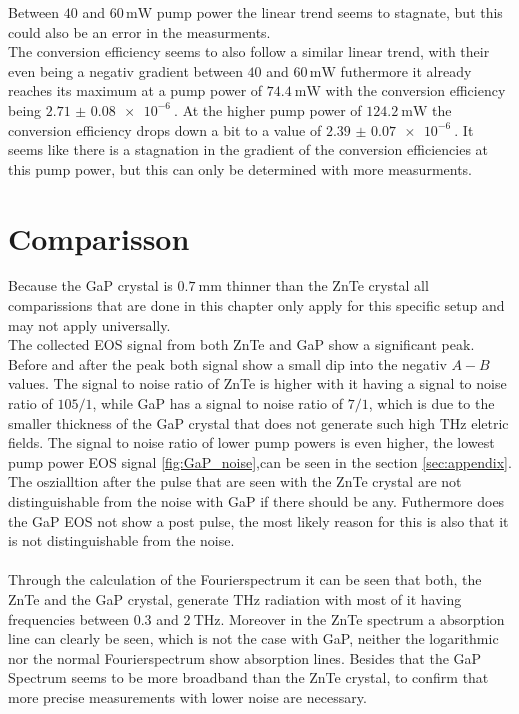 Between $40$ and $60 \, \si{\milli\W}$ pump power the linear trend seems to stagnate, but this could also be an error in the measurments.
\\
The conversion efficiency seems to also follow a similar linear trend, with their even being a negativ gradient between  $40$ and $60 \, \si{\milli\W}$ futhermore it already reaches its maximum at a pump power of $\SI{74.4}{\milli\W}$ with the conversion efficiency being $\SI{2.71(8)e-6}{}$.
At the higher pump power of $\SI{124.2}{\milli\W}$ the conversion efficiency drops down a bit to a value of $\SI{2.39(7)e-6}{}$.
It seems like there is a stagnation in the gradient of the conversion efficiencies at this pump power, but this can only be determined with more measurments.
\FloatBarrier
\section{Comparisson}
Because the GaP crystal is $\SI{0.7}{\milli\meter}$ thinner than the ZnTe crystal all comparissions that are done in this chapter only apply for this specific setup and may not apply universally.
\\
The collected EOS signal from both ZnTe and GaP show a significant peak.
Before and after the peak both signal show a small dip into the negativ $A-B$ values.
The signal to noise ratio of ZnTe is higher with it having a signal to noise ratio of $105/1$, while GaP has a signal to noise ratio of $7/1$, which is due to the smaller thickness of the GaP crystal that does not generate such high $\si{\tera\hertz}$ eletric fields.
The signal to noise ratio of lower pump powers is even higher, the lowest pump power EOS signal \ref{fig:GaP_noise},can be seen in the section \ref{sec:appendix}.
The oszialltion after the pulse that are seen with the ZnTe crystal are not distinguishable from the noise with GaP if there should be any.
Futhermore does the GaP EOS not show a post pulse, the most likely reason for this is also that it is not distinguishable from the noise.
\\\\
Through the calculation of the Fourierspectrum it can be seen that both, the ZnTe and the GaP crystal, generate $\si{\tera\hertz}$ radiation with most of it having frequencies between $0.3$ and $\SI{2}{\tera\hertz}$.
Moreover in the ZnTe spectrum a absorption line can clearly be seen, which is not the case with GaP, neither the logarithmic nor the normal Fourierspectrum show absorption lines.
Besides that the GaP Spectrum seems to be more broadband than the ZnTe crystal, to confirm that more precise measurements with lower noise are necessary.

